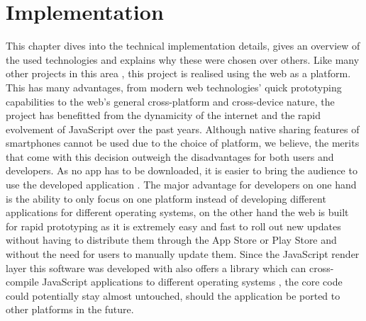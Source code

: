 \chapter{Implementation}
\label{cha:implementation}



This chapter dives into the technical implementation details, gives an overview of the used technologies and explains why these were chosen over others. Like many other projects in this area \cite{Bry:Backstage, Cheng:TreebasedOnlinePresentations, Esponda:ElectronicVotingOnTheFly, Inoue:RealTimeQuestionnaire, Teevan:MobileFeedbackDuringPresentation, Triglianos:InteractiveWebPresentationsImpress}, this project is realised using the web as a platform.
This has many advantages, from modern web technologies' quick prototyping capabilities to the web's general cross-platform and cross-device nature, the project has benefitted from the dynamicity of the internet and the rapid evolvement of JavaScript over the past years.
Although native sharing features of smartphones cannot be used due to the choice of platform, we believe, the merits that come with this decision outweigh the disadvantages for both users and developers. As no app has to be downloaded, it is easier to bring the audience to use the developed application \cite{Triglianos:InteractiveWebPresentationsImpress}. The major advantage for developers on one hand is the ability to only focus on one platform instead of developing different applications for different operating systems, on the other hand the web is built for rapid prototyping as it is extremely easy and fast to roll out new updates without having to distribute them through the App Store or Play Store and without the need for users to manually update them. Since the JavaScript render layer this software was developed with \cite{react} also offers a library which can cross-compile JavaScript applications to different operating systems \cite{react-native}, the core code could potentially stay almost untouched, should the application be ported to other platforms in the future.

